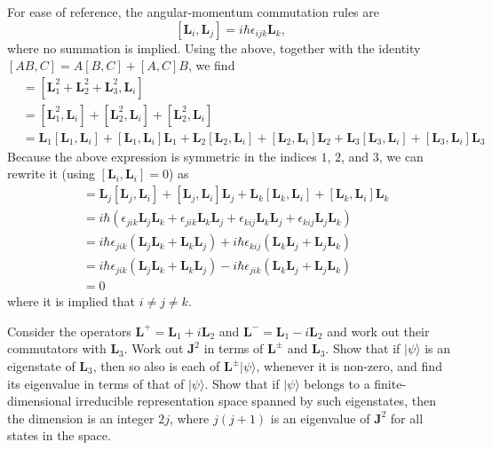 \documentclass[../road-to-reality.tex]{subfiles}
\begin{document}
\begin{questions}
\begin{solution}
	For ease of reference, the angular-momentum commutation rules are
	\[
		[\mathbf{L}_i,\mathbf{L}_j] = i\hbar\epsilon_{ijk}\mathbf{L}_k,
	\]
	where no summation is implied. Using the above, together with the identity $[AB, C] = A[B, C] + [A, C]B$, we find
	\begin{align*}
		[\mathbf{J}^2, \mathbf{L}_i] &= [\mathbf{L}_1^2 + \mathbf{L}_2^2 + \mathbf{L}_3^2, \mathbf{L}_i] \\
		&= [\mathbf{L}_1^2, \mathbf{L}_i] + [\mathbf{L}_2^2, \mathbf{L}_i] + [\mathbf{L}_2^2, \mathbf{L}_i] \\
		&= \mathbf{L}_1[\mathbf{L}_1, \mathbf{L}_i] + [\mathbf{L}_1, \mathbf{L}_i]\mathbf{L}_1 + \mathbf{L}_2[\mathbf{L}_2, \mathbf{L}_i] + [\mathbf{L}_2, \mathbf{L}_i]\mathbf{L}_2 + \mathbf{L}_3[\mathbf{L}_3, \mathbf{L}_i] + [\mathbf{L}_3, \mathbf{L}_i]\mathbf{L}_3
	\end{align*}
	Because the above expression is symmetric in the indices $1$, $2$, and $3$, we can rewrite it (using $[\mathbf{L}_i,\mathbf{L}_i]=0$) as
	\begin{align*}
	[\mathbf{J}^2, \mathbf{L}_i] &= \mathbf{L}_j[\mathbf{L}_j, \mathbf{L}_i] + [\mathbf{L}_j, \mathbf{L}_i]\mathbf{L}_j + \mathbf{L}_k[\mathbf{L}_k, \mathbf{L}_i] + [\mathbf{L}_k, \mathbf{L}_i]\mathbf{L}_k \\
	&= i\hbar(\epsilon_{jik}\mathbf{L}_j\mathbf{L}_k + \epsilon_{jik}\mathbf{L}_k\mathbf{L}_j + \epsilon_{kij}\mathbf{L}_k\mathbf{L}_j + \epsilon_{kij}\mathbf{L}_j\mathbf{L}_k) \\
	&= i\hbar\epsilon_{jik}(\mathbf{L}_j\mathbf{L}_k + \mathbf{L}_k\mathbf{L}_j) + i\hbar\epsilon_{kij}(\mathbf{L}_k\mathbf{L}_j + \mathbf{L}_j\mathbf{L}_k) \\
	&= i\hbar\epsilon_{jik}(\mathbf{L}_j\mathbf{L}_k + \mathbf{L}_k\mathbf{L}_j) - i\hbar\epsilon_{jik}(\mathbf{L}_k\mathbf{L}_j + \mathbf{L}_j\mathbf{L}_k) \\
	&= 0
	\end{align*}
	where it is implied that $i \neq j \neq k$.
\end{solution}

\question Consider the operators $\mathbf{L}^+ = \mathbf{L}_1 + i\mathbf{L}_2$ and $\mathbf{L}^- = \mathbf{L}_1 - i\mathbf{L}_2$ and work out their commutators with $\mathbf{L}_3$. Work out $\mathbf{J}^2$ in terms of $\mathbf{L}^\pm$ and $\mathbf{L}_3$. Show that if $|\psi\rangle$ is an eigenstate of $\mathbf{L}_3$, then so also is each of $\mathbf{L}^\pm|\psi\rangle$, whenever it is non-zero, and find its eigenvalue in terms of that of $|\psi\rangle$. Show that if $|\psi\rangle$ belongs to a finite-dimensional irreducible representation space spanned by such eigenstates, then the dimension is an integer $2j$, where $j(j+1)$ is an eigenvalue of $\mathbf{J}^2$ for all states in the space.


\end{questions}
\end{document}
